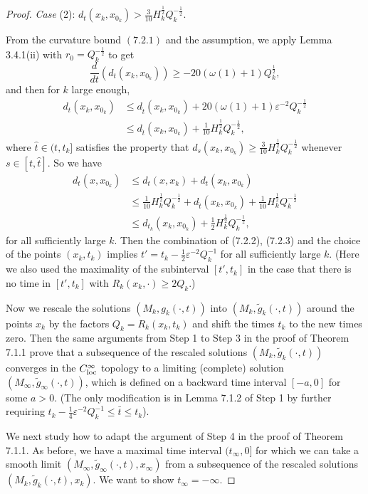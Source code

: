 \begin{proof}
\medskip
{\it Case} (2): $d_t(x_k,x_{0_k}) >
\frac{3}{10}H_k^{\frac{1}{2}}Q_k^{-\frac{1}{2}}.$

\smallskip
{}From the curvature bound $(7.2.1)$ and the assumption, we apply
Lemma 3.4.1(ii) with $r_0 = Q_k^{-\frac{1}{2}}$ to get
$$
\frac{d}{dt}(d_t(x_k,x_{0_k})) \geq -20(\omega(1) +
1)Q_k^{\frac{1}{2}},
$$
and then for $k$ large enough,
\begin{align*}
d_t(x_k,x_{0_k})&  \leq d_{\hat{t}}(x_k,x_{0_k})
+ 20(\omega(1)+1)\varepsilon^{-2}Q_k^{-\frac{1}{2}}\\
&  \leq d_{\hat{t}}(x_k,x_{0_k}) +
\frac{1}{10}H_k^{\frac{1}{2}}Q_k^{-\frac{1}{2}},
\end{align*}
where $\hat{t} \in (t,t_k]$ satisfies the property that
$d_s(x_k,x_{0_k}) \geq
\frac{3}{10}H_k^{\frac{1}{2}}Q_k^{-\frac{1}{2}}$ whenever $s \in
[t,\hat{t}]$. So we have
\begin{align}
d_t(x,x_{0_k})&  \leq d_t(x,x_k) + d_t(x_k,x_{0_k})\\
&  \leq\frac{1}{10}H_k^{\frac{1}{2}}Q_k^{-\frac{1}{2}} +
d_{\hat{t}}(x_k,x_{0_k})
+ \frac{1}{10}H_k^{\frac{1}{2}}Q_k^{-\frac{1}{2}} \nonumber\\
&  \leq d_{t_k}(x_k,x_{0_k}) +
\frac{1}{2}H_k^{\frac{1}{2}}Q_k^{-\frac{1}{2}},\nonumber
\end{align}   %
for all sufficiently large $k$. Then the combination of (7.2.2),
(7.2.3) and the choice of the points $(x_k,t_k)$ implies $t'=
t_k-\frac{1}{2}\varepsilon^{-2}Q_k^{-1}$ for all sufficiently
large $k$. (Here we also used the maximality of the subinterval
$[t',t_k]$ in the case that there is no time in $ [t',t_k]$ with
$R_k(x_k,\cdot) \geq 2Q_k$.)

Now we rescale the solutions $(M_k,g_k(\cdot,t))$ into
$(M_k,\tilde{g}_k(\cdot,t))$ around the points $x_k$ by the
factors $Q_k=R_k(x_k,t_k)$ and shift the times $t_k$ to the new
times zero. Then the same arguments from Step 1 to Step 3 in the
proof of Theorem 7.1.1 prove that a subsequence of the rescaled
solutions $(M_k,\tilde{g}_k(\cdot,t))$ converges in the
$C^\infty_{\rm loc}$ topology to a limiting (complete) solution
$(M_{\infty},\tilde{g}_{\infty}(\cdot,t))$, which is defined on a
backward time interval $[-a,0]$ for some $a>0$. (The only
modification is in Lemma 7.1.2 of Step 1 by further requiring
$t_k- \frac{1}{4}\varepsilon^{-2}Q_k^{-1} \leq \bar{t} \leq t_k$).

We next study how to adapt the argument of Step 4 in the proof of
Theorem 7.1.1. As before, we have a maximal time interval
$(t_{\infty},0]$ for which we can take a smooth limit
$(M_{\infty},\tilde{g}_{\infty}(\cdot,t),x_{\infty})$ from a
subsequence of the rescaled solutions
$(M_k,\tilde{g}_k(\cdot,t),x_k)$. We want to show
$t_{\infty}=-\infty$.


\end{proof}
